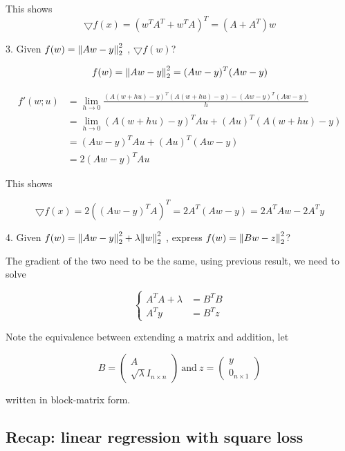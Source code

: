 \documentclass{article}
\begin{document}
This shows
$$
\bigtriangledown f(x) = (w^{T} A^{T} + w^{T} A)^{T} = (A + A^{T}) w
$$

3. Given $f(w) = \norm{Aw - y}_2^2$ , $\bigtriangledown f(w)$?

$$
f(w) = \norm{Aw - y}_2^2 = (Aw - y)^{T} (Aw - y)
$$

\begin{align*}
f'(w; u) &= \lim\limits_{h \to 0}{\frac{(A (w + hu) - y)^{T} (A (w + hu) - y) - (Aw - y)^{T} (Aw - y)}{h}} \\
         &= \lim\limits_{h \to 0}{ (A (w + hu) - y)^{T} A u + (A u)^{T} (A (w + hu) - y)} \\
         &= (A w - y)^{T} A u + (A u)^{T} (A w - y) \\
         &= 2 (A w - y)^{T} A u
\end{align*}

This shows

$$
\bigtriangledown f(x) = 2 ((A w - y)^{T} A)^{T} = 2 A^{T} (A w - y) = 2 A^{T} A w - 2 A^{T} y
$$

4. Given $f(w) = \norm{Aw - y}_2^2 + \lambda \norm{w}_2^2$ , express $f(w) = \norm{Bw - z}_2^2$?

The gradient of the two need to be the same, using previous result, we need to solve

$$
\begin{cases}
A^{T} A + \lambda &= B^{T} B \\
          A^{T} y &= B^{T} z
\end{cases}
$$

Note the equivalence between extending a matrix and addition, let

$$
B = \begin{pmatrix} A \\ \sqrt{\lambda} I_{n \times n} \end{pmatrix} ~ \text{and} ~ z = \begin{pmatrix} y \\ 0_{n \times 1} \end{pmatrix}
$$

written in block-matrix form.

\subsection{Recap: linear regression with square loss}
\end{document}
